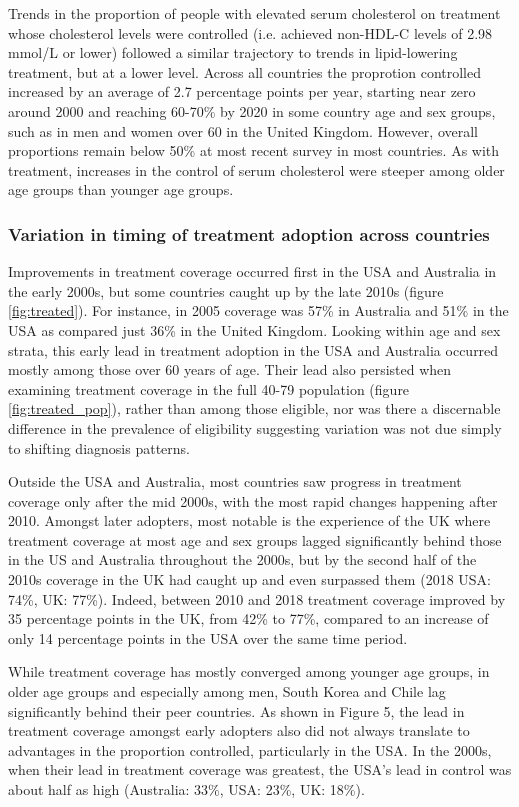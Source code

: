 \documentclass[12pt]{article}
\begin{document}
\begin{refsection}
Trends in the proportion of people with elevated serum cholesterol on treatment whose cholesterol levels were controlled (i.e. achieved non-HDL-C levels of 2.98 mmol/L or lower) followed a similar trajectory to trends in lipid-lowering treatment, but at a lower level. Across all countries the proprotion controlled increased by an average of 2.7 percentage points per year, starting near zero around 2000 and reaching 60-70\% by 2020 in some country age and sex groups, such as in men and women over 60 in the United Kingdom. However, overall proportions remain below 50\% at most recent survey in most countries. As with treatment, increases in the control of serum cholesterol were steeper among older age groups than younger age groups. 

\subsubsection*{Variation in timing of treatment adoption across countries}

Improvements in treatment coverage occurred first in the USA and Australia in the early 2000s, but some countries caught up by the late 2010s (figure \ref{fig:treated}). For instance, in 2005 coverage was 57\% in Australia and 51\% in the USA as compared just 36\% in the United Kingdom. Looking within age and sex strata, this early lead in treatment adoption in the USA and Australia occurred mostly among those over 60 years of age. Their lead also persisted when examining treatment coverage in the full 40-79 population (figure \ref{fig:treated_pop}), rather than among those eligible, nor was there a discernable difference in the prevalence of eligibility suggesting variation was not due simply to shifting diagnosis patterns. 

Outside the USA and Australia, most countries saw progress in treatment coverage only after the mid 2000s, with the most rapid changes happening after 2010. Amongst later adopters, most notable is the experience of the UK where treatment coverage at most age and sex groups lagged significantly behind those in the US and Australia throughout the 2000s, but by the second half of the 2010s coverage in the UK had caught up and even surpassed them (2018 USA: 74\%, UK: 77\%). Indeed, between 2010 and 2018 treatment coverage improved by 35 percentage points in the UK, from 42\% to 77\%, compared to an increase of only 14 percentage points in the USA over the same time period.

While treatment coverage has mostly converged among younger age groups, in older age groups and especially among men, South Korea and Chile lag significantly behind their peer countries. As shown in Figure 5, the lead in treatment coverage amongst early adopters also did not always translate to advantages in the proportion controlled, particularly in the USA. In the 2000s, when their lead in treatment coverage was greatest, the USA's lead in control was about half as high (Australia: 33\%, USA: 23\%, UK: 18\%). 


\end{refsection}
\end{document}
